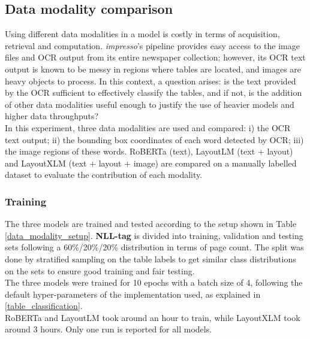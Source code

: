 \subsection{Data modality comparison}
\label{classification_benchmark}
Using different data modalities in a model is costly in terms of acquisition, retrieval and computation. \textit{impresso}'s pipeline provides easy access to the image files and OCR output from its entire newspaper collection; however, its OCR text output is known to be messy in regions where tables are located, and images are heavy objects to process. In this context, a question arises: is the text provided by the OCR sufficient to effectively classify the tables, and if not, is the addition of other data modalities useful enough to justify the use of heavier models and higher data throughputs? \\
In this experiment, three data modalities are used and compared: i) the OCR text output; ii) the bounding box coordinates of each word detected by OCR; iii) the image regions of these words. RoBERTa (text), LayoutLM (text + layout) and LayoutXLM (text + layout + image) are compared on a manually labelled dataset to evaluate the contribution of each modality.

\subsubsection{Training}
The three models are trained and tested according to the setup shown in Table \ref{data_modality_setup}. \textbf{NLL-tag} is divided into training, validation and testing sets following a 60\%/20\%/20\% distribution in terms of page count. The split was done by stratified sampling on the table labels to get similar class distributions on the sets to ensure good training and fair testing.  \\
The three models were trained for 10 epochs with a batch size of 4, following the default hyper-parameters of the implementation used, as explained in \ref{table_classification}. \\

RoBERTa and LayoutLM took around an hour to train, while LayoutXLM took around 3 hours. Only one run is reported for all models. 

